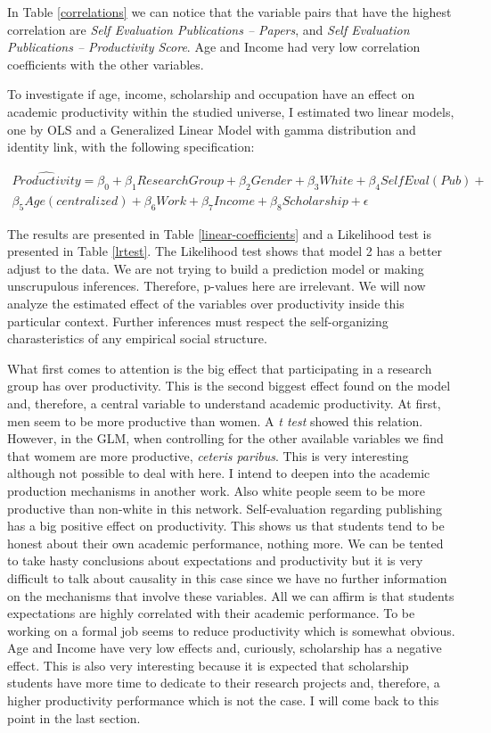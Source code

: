 \documentclass[12pt, english]{article}
\begin{document}
In Table \ref{correlations} we can notice that the variable pairs that have the highest correlation are \textit{Self Evaluation Publications -- Papers}, and \textit{Self Evaluation Publications -- Productivity Score}. Age and Income had very low correlation coefficients with the other variables.

To investigate if age, income, scholarship and occupation have an effect on academic productivity within the studied universe, I estimated two linear models, one by OLS and a Generalized Linear Model with gamma distribution and identity link, with the following specification:

\begin{multline}
\label{linear}
\widehat{Productivity} = \beta_0 + \beta_1ResearchGroup + \beta_2Gender + \beta_3White + \beta_4Self Eval(Pub) + \\ \beta_5Age(centralized) + \beta_6Work + \beta_7Income + \beta_8Scholarship + \epsilon
\end{multline}

The results are presented in Table \ref{linear-coefficients} and a Likelihood test is presented in Table \ref{lrtest}. The Likelihood test shows that model 2 has a better adjust to the data. We are not trying to build a prediction model or making unscrupulous inferences. Therefore, p-values here are irrelevant. We will now analyze the estimated effect of the variables over productivity inside this particular context. Further inferences must respect the self-organizing charasteristics of any empirical social structure. 

What first comes to attention is the big effect that participating in a research group has over productivity.  This is the second biggest effect found on the model and, therefore, a central variable to understand academic productivity. At first, men seem to be more productive than women. A \textit{t test} showed this relation. However, in the GLM, when controlling for the other available variables we find that womem are more productive, \textit{ceteris paribus}. This is very interesting although not possible to deal with here. I intend to deepen into the academic production mechanisms in another work. Also white people seem to be more productive than non-white in this network. Self-evaluation regarding publishing has a big positive effect on productivity. This shows us that students tend to be honest about their own academic performance, nothing more. We can be tented to take hasty conclusions about expectations and productivity but it is very difficult to talk about causality in this case since we have no further information on the mechanisms that involve these variables. All we can affirm is that students expectations are highly correlated with their academic performance. To be working on a formal job seems to reduce productivity which is somewhat obvious. Age and Income have very low effects and, curiously, scholarship has a negative effect. This is also very interesting because it is expected that scholarship students have more time to dedicate to their research projects and, therefore, a higher productivity performance which is not the case. I will come back to this point in the last section.
\end{document}
